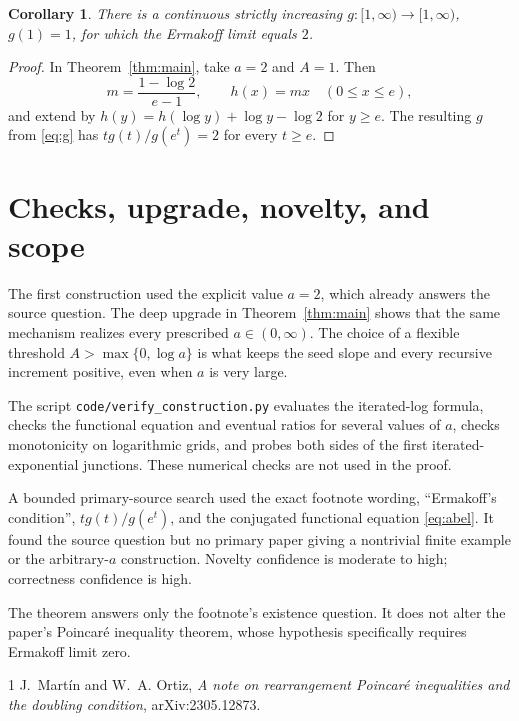 \documentclass[11pt,a4paper]{article}
\newtheorem{corollary}[theorem]{Corollary}
\begin{document}
\begin{corollary}\label{cor:two}
There is a continuous strictly increasing $g:[1,\infty)\to[1,\infty)$,
$g(1)=1$, for which the Ermakoff limit equals $2$.
\end{corollary}

\begin{proof}
In Theorem~\ref{thm:main}, take $a=2$ and $A=1$.  Then
\[
 m=\frac{1-\log2}{e-1},\qquad
 h(x)=mx\quad(0\le x\le e),
\]
and extend by $h(y)=h(\log y)+\log y-\log2$ for $y\ge e$.
The resulting $g$ from \eqref{eq:g} has
$t g(t)/g(e^t)=2$ for every $t\ge e$.
\end{proof}

\section{Checks, upgrade, novelty, and scope}

The first construction used the explicit value $a=2$, which already answers
the source question.  The deep upgrade in Theorem~\ref{thm:main} shows that
the same mechanism realizes every prescribed $a\in(0,\infty)$.  The choice
of a flexible threshold $A>\max\{0,\log a\}$ is what keeps the seed slope and
every recursive increment positive, even when $a$ is very large.

The script \texttt{code/verify\_construction.py} evaluates the iterated-log
formula, checks the functional equation and eventual ratios for several
values of $a$, checks monotonicity on logarithmic grids, and probes both sides
of the first iterated-exponential junctions.  These numerical checks are not
used in the proof.

A bounded primary-source search used the exact footnote wording,
``Ermakoff's condition'', $t g(t)/g(e^t)$, and the conjugated functional
equation \eqref{eq:abel}.  It found the source question but no primary paper
giving a nontrivial finite example or the arbitrary-$a$ construction.
Novelty confidence is moderate to high; correctness confidence is high.

The theorem answers only the footnote's existence question.  It does not
alter the paper's Poincar\'e inequality theorem, whose hypothesis specifically
requires Ermakoff limit zero.

\begin{thebibliography}{1}
J.~Mart\'in and W.~A. Ortiz,
\emph{A note on rearrangement Poincar\'e inequalities and the doubling
condition}, arXiv:2305.12873.
\end{thebibliography}
\end{document}
